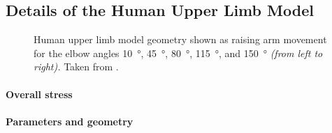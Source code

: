 \subsection{Details of the Human Upper Limb Model}
\label{sec:712details}

\begin{figure}
  \hfill%
  \hfill%
  \hfill%
  \hfill%
  \hfill\strut%
  \caption[Raising arm movement]{%
    Human upper limb model geometry shown as raising arm movement
    for the elbow angles
    \SI{10}{\degree}, \SI{45}{\degree}, \SI{80}{\degree},
    \SI{115}{\degree}, and \SI{150}{\degree} \emph{(from left to right).}
    Taken from \cite{Sprenger15Continuum}.%
  }%
  \label{fig:raisingArm}%
\end{figure}

\paragraph{Overall stress}

\cite{Soennerlind13Why}

\dummytext{}

\paragraph{Parameters and geometry}

\cite{Spitzer96Visible}
\cite{Sprenger15Continuum}

\dummytext{}
